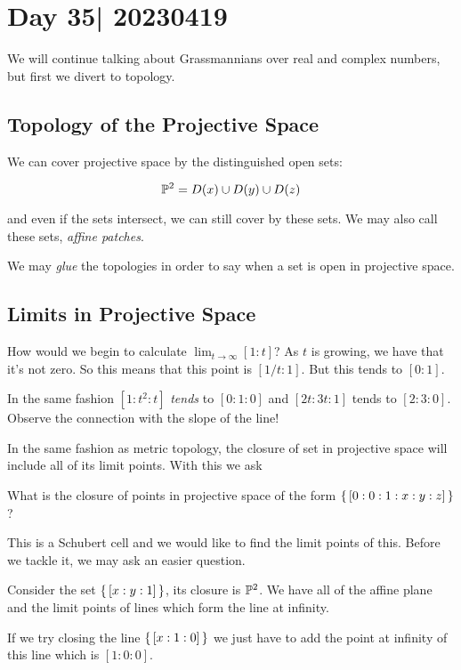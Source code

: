\documentclass[12pt]{memoir}
\begin{document}
\section{Day 35| 20230419}

We will continue talking about Grassmannians over real and complex numbers, but first we divert to topology.

\subsection{Topology of the Projective Space}

We can cover projective space by the distinguished open sets:

$$\mathbb{P}^2=D(x)\cup D(y)\cup D(z)$$

and even if the sets intersect, we can still cover by these sets. We may also call these sets, \emph{affine patches}.\par 
We may \emph{glue} the topologies in order to say when a set is open in projective space.

\subsection{Limits in Projective Space}

How would we begin to calculate $\lim_{t\to\infty}[1:t]$? As $t$ is growing, we have that it's not zero. So this means that this point is $[1/t:1]$. But this tends to $[0:1]$.\par 
In the same fashion $[1:t^2:t]$ \emph{tends} to $[0:1:0]$ and $[2t:3t:1]$ tends to $[2:3:0]$. Observe the connection with the slope of the line!\par 
In the same fashion as metric topology, the closure of set in projective space will include all of its limit points. With this we ask 
\begin{significant}
    What is the closure of points in projective space of the form $\{\,[0:0:1:x:y:z]\,\}$?
\end{significant}
This is a Schubert cell and we would like to find the limit points of this. Before we tackle it, we may ask an easier question.

\begin{Ex}
    Consider the set $\{\,[x:y:1]\,\}$, its closure is $\mathbb{P}^2$. We have all of the affine plane and the limit points of lines which form the line at infinity.\par 
    If we try closing the line $\{\,[x:1:0]\,\}$ we just have to add the point at infinity of this line which is $[1:0:0]$.
\end{Ex}
\end{document}
